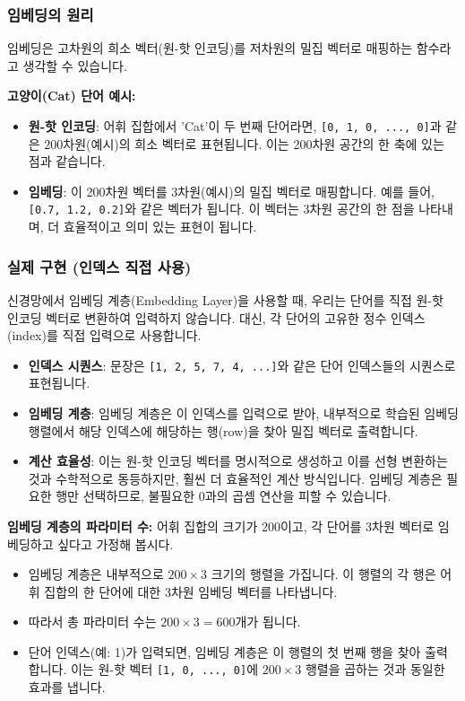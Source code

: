 \documentclass[11pt,a4paper]{article}
\theoremstyle{definition}
\begin{document}
\subsubsection{임베딩의 원리}
임베딩은 고차원의 희소 벡터(원-핫 인코딩)를 저차원의 밀집 벡터로 매핑하는 함수라고 생각할 수 있습니다.

\begin{tcolorbox}[examplebox, title=\textbf{예시}]
\textbf{고양이(Cat) 단어 예시:}
\begin{itemize}
    \item \textbf{원-핫 인코딩}: 어휘 집합에서 'Cat'이 두 번째 단어라면, \texttt{[0, 1, 0, ..., 0]}과 같은 200차원(예시)의 희소 벡터로 표현됩니다. 이는 200차원 공간의 한 축에 있는 점과 같습니다.
    \item \textbf{임베딩}: 이 200차원 벡터를 3차원(예시)의 밀집 벡터로 매핑합니다. 예를 들어, \texttt{[0.7, 1.2, 0.2]}와 같은 벡터가 됩니다. 이 벡터는 3차원 공간의 한 점을 나타내며, 더 효율적이고 의미 있는 표현이 됩니다.
\end{itemize}
\end{tcolorbox}

\subsubsection{실제 구현 (인덱스 직접 사용)}
신경망에서 임베딩 계층(Embedding Layer)을 사용할 때, 우리는 단어를 직접 원-핫 인코딩 벡터로 변환하여 입력하지 않습니다. 대신, 각 단어의 고유한 정수 인덱스(index)를 직접 입력으로 사용합니다.

\begin{itemize}
    \item \textbf{인덱스 시퀀스}: 문장은 \texttt{[1, 2, 5, 7, 4, ...]}와 같은 단어 인덱스들의 시퀀스로 표현됩니다.
    \item \textbf{임베딩 계층}: 임베딩 계층은 이 인덱스를 입력으로 받아, 내부적으로 학습된 임베딩 행렬에서 해당 인덱스에 해당하는 행(row)을 찾아 밀집 벡터로 출력합니다.
    \item \textbf{계산 효율성}: 이는 원-핫 인코딩 벡터를 명시적으로 생성하고 이를 선형 변환하는 것과 수학적으로 동등하지만, 훨씬 더 효율적인 계산 방식입니다. 임베딩 계층은 필요한 행만 선택하므로, 불필요한 0과의 곱셈 연산을 피할 수 있습니다.
\end{itemize}

\begin{tcolorbox}[examplebox, title=\textbf{예시}]
\textbf{임베딩 계층의 파라미터 수:}
어휘 집합의 크기가 200이고, 각 단어를 3차원 벡터로 임베딩하고 싶다고 가정해 봅시다.
\begin{itemize}
    \item 임베딩 계층은 내부적으로 $200 \times 3$ 크기의 행렬을 가집니다. 이 행렬의 각 행은 어휘 집합의 한 단어에 대한 3차원 임베딩 벡터를 나타냅니다.
    \item 따라서 총 파라미터 수는 $200 \times 3 = 600$개가 됩니다.
    \item 단어 인덱스(예: 1)가 입력되면, 임베딩 계층은 이 행렬의 첫 번째 행을 찾아 출력합니다. 이는 원-핫 벡터 \texttt{[1, 0, ..., 0]}에 $200 \times 3$ 행렬을 곱하는 것과 동일한 효과를 냅니다.
\end{itemize}
\end{tcolorbox}
\end{document}
